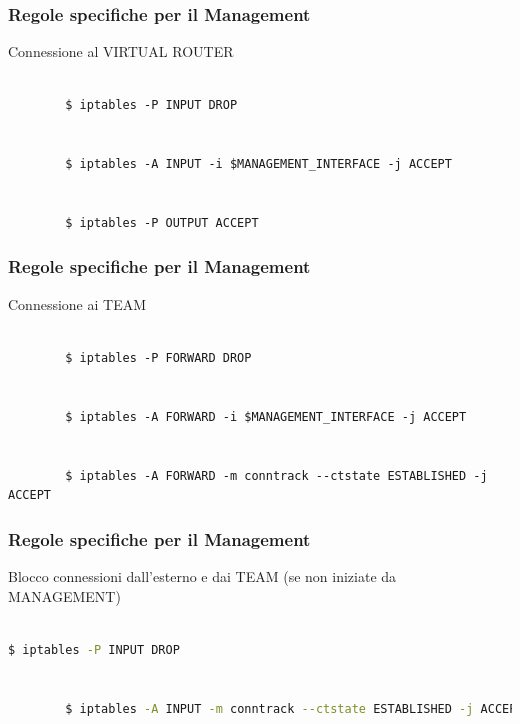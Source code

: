 \documentclass{beamer}
\begin{document}
\begin{frame}[fragile]
    \frametitle{Regole specifiche per il Management}
    Connessione al VIRTUAL ROUTER
    \\~\\
    \begin{lstlisting}
        $ iptables -P INPUT DROP
        
        
        $ iptables -A INPUT -i $MANAGEMENT_INTERFACE -j ACCEPT
        
        
        $ iptables -P OUTPUT ACCEPT

    \end{lstlisting}
\end{frame}

\begin{frame}[fragile]
    \frametitle{Regole specifiche per il Management}
    Connessione ai TEAM
    \\~\\
    \begin{lstlisting}
        $ iptables -P FORWARD DROP
        
        
        $ iptables -A FORWARD -i $MANAGEMENT_INTERFACE -j ACCEPT
        
        
        $ iptables -A FORWARD -m conntrack --ctstate ESTABLISHED -j ACCEPT
    \end{lstlisting}
\end{frame}

\begin{frame}[fragile]
    \frametitle{Regole specifiche per il Management}
    Blocco connessioni dall'esterno e dai TEAM (se non iniziate da MANAGEMENT)
    \\~\\
    \begin{lstlisting}[language=sh]
        $ iptables -P INPUT DROP


        $ iptables -A INPUT -m conntrack --ctstate ESTABLISHED -j ACCEPT
    \end{lstlisting}
\end{frame}
\end{document}
